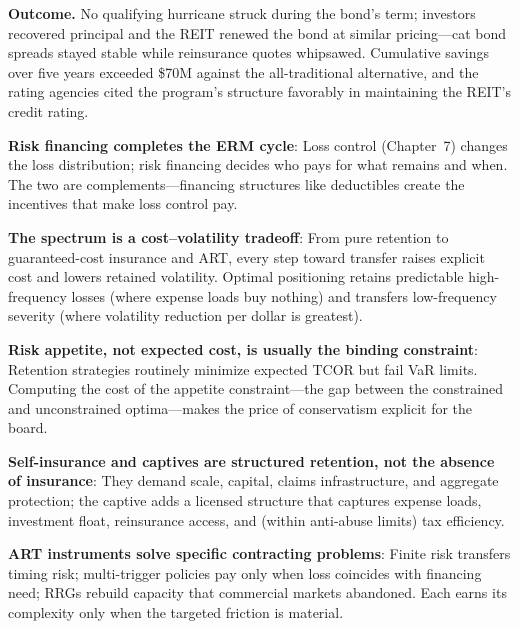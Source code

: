 \documentclass[11pt,openany]{book}
\begin{document}
\textbf{Outcome.} No qualifying hurricane struck during the bond's term;
investors recovered principal and the REIT renewed the bond at similar
pricing---cat bond spreads stayed stable while reinsurance quotes whipsawed.
Cumulative savings over five years exceeded \$70M against the all-traditional
alternative, and the rating agencies cited the program's structure favorably
in maintaining the REIT's credit rating.


\begin{keytakeaways}
\item
  \textbf{Risk financing completes the ERM cycle}: Loss control
  (Chapter~7) changes the loss distribution; risk
  financing decides who pays for what remains and when. The two are
  complements---financing structures like deductibles create the incentives
  that make loss control pay.
\item
  \textbf{The spectrum is a cost--volatility tradeoff}: From pure retention
  to guaranteed-cost insurance and ART, every step toward transfer raises
  explicit cost and lowers retained volatility. Optimal positioning retains
  predictable high-frequency losses (where expense loads buy nothing) and
  transfers low-frequency severity (where volatility reduction per dollar is
  greatest).
\item
  \textbf{Risk appetite, not expected cost, is usually the binding
  constraint}: Retention strategies routinely minimize expected TCOR but fail
  VaR limits. Computing the cost of the appetite constraint---the gap between
  the constrained and unconstrained optima---makes the price of conservatism
  explicit for the board.
\item
  \textbf{Self-insurance and captives are structured retention, not the
  absence of insurance}: They demand scale, capital, claims infrastructure,
  and aggregate protection; the captive adds a licensed structure that
  captures expense loads, investment float, reinsurance access, and (within
  anti-abuse limits) tax efficiency.
\item
  \textbf{ART instruments solve specific contracting problems}: Finite risk
  transfers timing risk; multi-trigger policies pay only when loss coincides
  with financing need; RRGs rebuild capacity that commercial markets
  abandoned. Each earns its complexity only when the targeted friction is
  material.

\end{keytakeaways}
\end{document}
